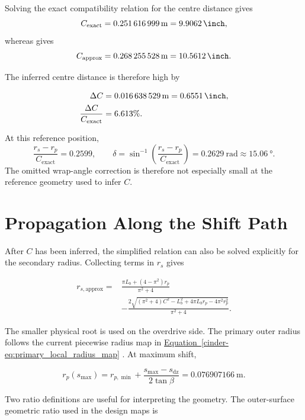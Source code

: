 \documentclass[11pt]{report}
\newcommand{\FormEq}[1]{%
    \hyperref[cinder-#1]{Equation~\ref*{cinder-#1}}%
  }
\newcommand{\FormEq}[1]{\textit{main formulation equation \nolinkurl{#1}}}
\begin{document}
Solving the exact compatibility relation for the centre distance gives
\[
C_{\mathrm{exact}}
=
\SI{0.251616999}{\metre}
=
\SI{9.9062}{\inch},
\]
whereas  gives
\[
C_{\mathrm{approx}}
=
\SI{0.268255528}{\metre}
=
\SI{10.5612}{\inch}.
\]

The inferred centre distance is therefore high by

\begin{align}
\Delta C
&=
\SI{0.016638529}{\metre}
=
\SI{0.6551}{\inch},
\\
\frac{\Delta C}{C_{\mathrm{exact}}}
&=
6.613\%.
\end{align}

At this reference position,
\[
\frac{r_s-r_p}{C_{\mathrm{exact}}}
=
0.2599,
\qquad
\delta
=
\sin^{-1}\!\left(\frac{r_s-r_p}{C_{\mathrm{exact}}}\right)
=
\SI{0.2629}{\radian}
\approx
\SI{15.06}{\degree}.
\]
The omitted wrap-angle correction is therefore not especially small at the
reference geometry used to infer \(C\).

\section{Propagation Along the Shift Path}

After \(C\) has been inferred, the simplified relation can also be solved
explicitly for the secondary radius. Collecting terms in \(r_s\) gives

\begin{equation}
\begin{aligned}
r_{s,\mathrm{approx}}
={}&
\frac{
\pi L_b+(4-\pi^2)r_p
}{\pi^2+4}
\\
&-
\frac{
2\sqrt{
(\pi^2+4)C^2
-L_b^2
+4\pi L_b r_p
-4\pi^2 r_p^2
}
}{\pi^2+4}.
\end{aligned}
\label{eq:secondary-radius-small-angle}
\end{equation}

The smaller physical root is used on the overdrive side. The primary outer
radius follows the current piecewise radius map in
\FormEq{eq:primary_local_radius_map}. At maximum shift,

\begin{equation}
r_p(s_{\max})
=
r_{p,\min}
+
\frac{s_{\max}-s_{\mathrm{dz}}}{2\tan\beta}
=
\SI{0.076907166}{\metre}.
\label{eq:primary-radius-at-max-note}
\end{equation}

Two ratio definitions are useful for interpreting the geometry. The
outer-surface geometric ratio used in the design maps is
\end{document}
